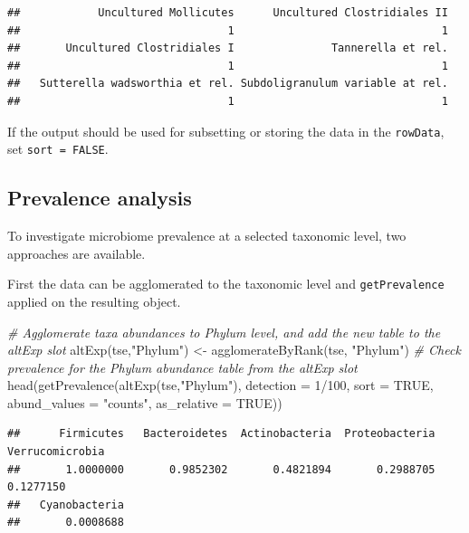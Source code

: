 \documentclass[
]{book}
\newenvironment{Shaded}{\begin{snugshade}}{\end{snugshade}}
\newcommand{\AttributeTok}[1]{\textcolor[rgb]{0.77,0.63,0.00}{#1}}
\newcommand{\CommentTok}[1]{\textcolor[rgb]{0.56,0.35,0.01}{\textit{#1}}}
\newcommand{\ConstantTok}[1]{\textcolor[rgb]{0.00,0.00,0.00}{#1}}
\newcommand{\DecValTok}[1]{\textcolor[rgb]{0.00,0.00,0.81}{#1}}
\newcommand{\FunctionTok}[1]{\textcolor[rgb]{0.00,0.00,0.00}{#1}}
\newcommand{\NormalTok}[1]{#1}
\newcommand{\OtherTok}[1]{\textcolor[rgb]{0.56,0.35,0.01}{#1}}
\newcommand{\SpecialCharTok}[1]{\textcolor[rgb]{0.00,0.00,0.00}{#1}}
\newcommand{\StringTok}[1]{\textcolor[rgb]{0.31,0.60,0.02}{#1}}
\begin{document}
\begin{verbatim}
##            Uncultured Mollicutes      Uncultured Clostridiales II 
##                                1                                1 
##       Uncultured Clostridiales I               Tannerella et rel. 
##                                1                                1 
##   Sutterella wadsworthia et rel. Subdoligranulum variable at rel. 
##                                1                                1
\end{verbatim}

If the output should be used for subsetting or storing the data in the
\texttt{rowData}, set \texttt{sort\ =\ FALSE}.

\hypertarget{prevalence-analysis}{%
\subsection{Prevalence analysis}\label{prevalence-analysis}}

To investigate microbiome prevalence at a selected taxonomic level, two
approaches are available.

First the data can be agglomerated to the taxonomic level and \texttt{getPrevalence}
applied on the resulting object.

\begin{Shaded}
\begin{Highlighting}[]
\CommentTok{\# Agglomerate taxa abundances to Phylum level, and add the new table to the altExp slot}
\FunctionTok{altExp}\NormalTok{(tse,}\StringTok{"Phylum"}\NormalTok{) }\OtherTok{\textless{}{-}} \FunctionTok{agglomerateByRank}\NormalTok{(tse, }\StringTok{"Phylum"}\NormalTok{)}
\CommentTok{\# Check prevalence for the Phylum abundance table from the altExp slot}
\FunctionTok{head}\NormalTok{(}\FunctionTok{getPrevalence}\NormalTok{(}\FunctionTok{altExp}\NormalTok{(tse,}\StringTok{"Phylum"}\NormalTok{), }\AttributeTok{detection =} \DecValTok{1}\SpecialCharTok{/}\DecValTok{100}\NormalTok{, }\AttributeTok{sort =} \ConstantTok{TRUE}\NormalTok{,}
                   \AttributeTok{abund\_values =} \StringTok{"counts"}\NormalTok{, }\AttributeTok{as\_relative =} \ConstantTok{TRUE}\NormalTok{))}
\end{Highlighting}
\end{Shaded}

\begin{verbatim}
##      Firmicutes   Bacteroidetes  Actinobacteria  Proteobacteria Verrucomicrobia 
##       1.0000000       0.9852302       0.4821894       0.2988705       0.1277150 
##   Cyanobacteria 
##       0.0008688
\end{verbatim}
\end{document}
